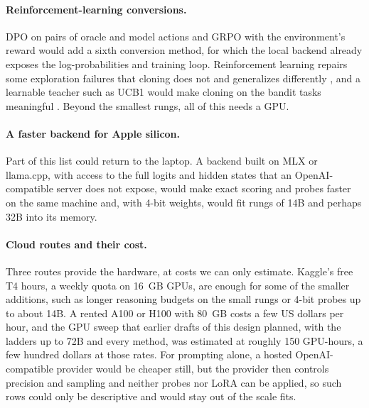 \paragraph{Reinforcement-learning conversions.}
DPO on pairs of oracle and model actions \citep{rafailov2023dpo} and GRPO with the environment's reward \citep{shao2024deepseekmath} would add a sixth conversion method, for which the local backend already exposes the log-probabilities and training loop. Reinforcement learning repairs some exploration failures that cloning does not \citep{schmied2026greedy} and generalizes differently \citep{chu2025sft}, and a learnable teacher such as UCB1 would make cloning on the bandit tasks meaningful \citep{laskin2023incontext}. Beyond the smallest rungs, all of this needs a GPU.

\paragraph{A faster backend for Apple silicon.}
Part of this list could return to the laptop. A backend built on MLX or llama.cpp, with access to the full logits and hidden states that an OpenAI-compatible server does not expose, would make exact scoring and probes faster on the same machine and, with 4-bit weights, would fit rungs of 14B and perhaps 32B into its memory.

\paragraph{Cloud routes and their cost.}
Three routes provide the hardware, at costs we can only estimate. Kaggle's free T4 hours, a weekly quota on 16~GB GPUs, are enough for some of the smaller additions, such as longer reasoning budgets on the small rungs or 4-bit probes up to about 14B. A rented A100 or H100 with 80~GB costs a few US dollars per hour, and the GPU sweep that earlier drafts of this design planned, with the ladders up to 72B and every method, was estimated at roughly 150 GPU-hours, a few hundred dollars at those rates. For prompting alone, a hosted OpenAI-compatible provider would be cheaper still, but the provider then controls precision and sampling and neither probes nor LoRA can be applied, so such rows could only be descriptive and would stay out of the scale fits.
